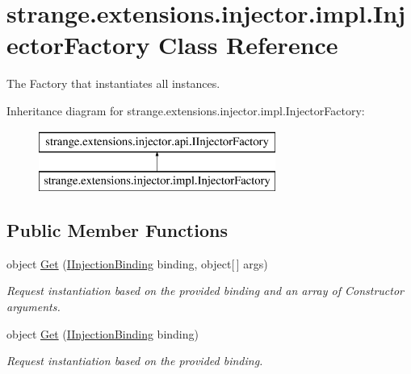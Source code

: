 \hypertarget{classstrange_1_1extensions_1_1injector_1_1impl_1_1_injector_factory}{\section{strange.\-extensions.\-injector.\-impl.\-Injector\-Factory Class Reference}
\label{classstrange_1_1extensions_1_1injector_1_1impl_1_1_injector_factory}
}


The Factory that instantiates all instances.  


Inheritance diagram for strange.\-extensions.\-injector.\-impl.\-Injector\-Factory\-:\begin{figure}[H]
\begin{center}
\leavevmode
\includegraphics[height=2.000000cm]{classstrange_1_1extensions_1_1injector_1_1impl_1_1_injector_factory}
\end{center}
\end{figure}
\subsection*{Public Member Functions}
\begin{DoxyCompactItemize}
\item 
\hypertarget{classstrange_1_1extensions_1_1injector_1_1impl_1_1_injector_factory_a7993cabac7422d20ff103a0a16b1b7f1}{object \hyperlink{classstrange_1_1extensions_1_1injector_1_1impl_1_1_injector_factory_a7993cabac7422d20ff103a0a16b1b7f1}{Get} (\hyperlink{interfacestrange_1_1extensions_1_1injector_1_1api_1_1_i_injection_binding}{I\-Injection\-Binding} binding, object\mbox{[}$\,$\mbox{]} args)}\label{classstrange_1_1extensions_1_1injector_1_1impl_1_1_injector_factory_a7993cabac7422d20ff103a0a16b1b7f1}

\begin{DoxyCompactList}\small\item\em Request instantiation based on the provided binding and an array of Constructor arguments. \end{DoxyCompactList}\item 
\hypertarget{classstrange_1_1extensions_1_1injector_1_1impl_1_1_injector_factory_a61a12e3b59787fb6f000f0778a255b8a}{object \hyperlink{classstrange_1_1extensions_1_1injector_1_1impl_1_1_injector_factory_a61a12e3b59787fb6f000f0778a255b8a}{Get} (\hyperlink{interfacestrange_1_1extensions_1_1injector_1_1api_1_1_i_injection_binding}{I\-Injection\-Binding} binding)}\label{classstrange_1_1extensions_1_1injector_1_1impl_1_1_injector_factory_a61a12e3b59787fb6f000f0778a255b8a}

\begin{DoxyCompactList}\small\item\em Request instantiation based on the provided binding. \end{DoxyCompactList}\end{DoxyCompactItemize}
